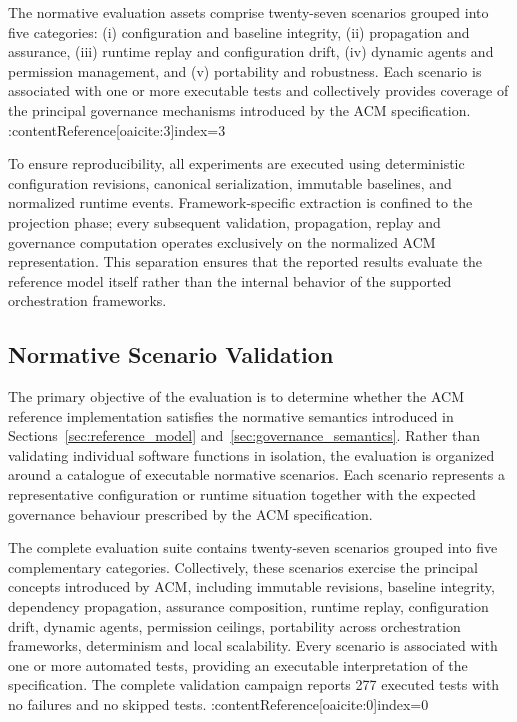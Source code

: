 \documentclass[10pt]{article}
\begin{document}
The normative evaluation assets comprise twenty-seven scenarios grouped into five categories: (i) configuration and baseline integrity, (ii) propagation and assurance, (iii) runtime replay and configuration drift, (iv) dynamic agents and permission management, and (v) portability and robustness. Each scenario is associated with one or more executable tests and collectively provides coverage of the principal governance mechanisms introduced by the ACM specification. :contentReference[oaicite:3]{index=3}

To ensure reproducibility, all experiments are executed using deterministic configuration revisions, canonical serialization, immutable baselines, and normalized runtime events. Framework-specific extraction is confined to the projection phase; every subsequent validation, propagation, replay and governance computation operates exclusively on the normalized ACM representation. This separation ensures that the reported results evaluate the reference model itself rather than the internal behavior of the supported orchestration frameworks.

\subsection{Normative Scenario Validation}
\label{sec:normative_validation}

The primary objective of the evaluation is to determine whether the ACM reference implementation satisfies the normative semantics introduced in Sections~\ref{sec:reference_model} and~\ref{sec:governance_semantics}. Rather than validating individual software functions in isolation, the evaluation is organized around a catalogue of executable normative scenarios. Each scenario represents a representative configuration or runtime situation together with the expected governance behaviour prescribed by the ACM specification.

The complete evaluation suite contains twenty-seven scenarios grouped into five complementary categories. Collectively, these scenarios exercise the principal concepts introduced by ACM, including immutable revisions, baseline integrity, dependency propagation, assurance composition, runtime replay, configuration drift, dynamic agents, permission ceilings, portability across orchestration frameworks, determinism and local scalability. Every scenario is associated with one or more automated tests, providing an executable interpretation of the specification. The complete validation campaign reports 277 executed tests with no failures and no skipped tests. :contentReference[oaicite:0]{index=0}
\end{document}
